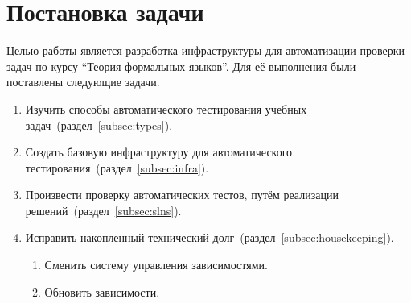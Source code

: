 
\section{Постановка задачи}
\label{sec:task}

Целью работы является разработка инфраструктуры для автоматизации проверки задач по курсу \enquote{Теория формальных языков}.
Для её выполнения были поставлены следующие задачи.
\begin{enumerate}
    \item Изучить способы автоматического тестирования учебных задач~(раздел~\ref{subsec:types}).
    \item Создать базовую инфраструктуру для автоматического тестирования~(раздел~\ref{subsec:infra}).
    \item Произвести проверку автоматических тестов, путём реализации решений~(раздел~\ref{subsec:slns}).
    \item Исправить накопленный технический долг~(раздел~\ref{subsec:housekeeping}).
          \begin{enumerate}
              \item Сменить систему управления зависимостями.
              \item Обновить зависимости.
          \end{enumerate}
\end{enumerate}
